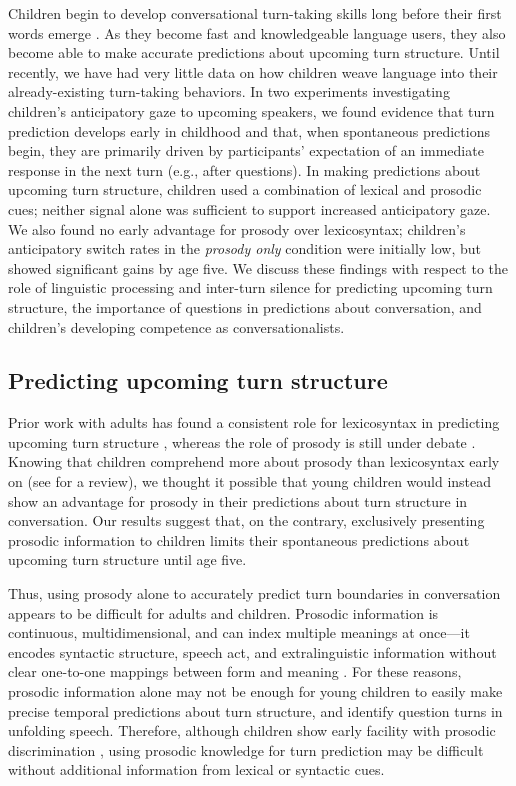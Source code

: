 \documentclass[authoryear, 12pt]{elsarticle}
\begin{document}
Children begin to develop conversational turn-taking skills long before their first words emerge \citep{bateson1975, hilbrink2015, jaffe2001, snow1977}. As they become fast and knowledgeable language users, they also become able to make accurate predictions about upcoming turn structure. Until recently, we have had very little data on how children weave language into their already-existing turn-taking behaviors. In two experiments investigating children's anticipatory gaze to upcoming speakers, we found evidence that turn prediction develops early in childhood and that, when spontaneous predictions begin, they are primarily driven by participants' expectation of an immediate response in the next turn (e.g., after questions). In making predictions about upcoming turn structure, children used a combination of lexical and prosodic cues; neither signal alone was sufficient to support increased anticipatory gaze. We also found no early advantage for prosody over lexicosyntax; children's anticipatory switch rates in the \textit{prosody only} condition were initially low, but showed significant gains by age five. We discuss these findings with respect to the role of linguistic processing and inter-turn silence for predicting upcoming turn structure, the importance of questions in predictions about conversation, and children's developing competence as conversationalists.

\subsection*{Predicting upcoming turn structure}

Prior work with adults has found a consistent role for lexicosyntax in predicting upcoming turn structure \citep{de-ruiter2006, magyari2012}, whereas the role of prosody is still under debate \citep{duncan1972, ford1996, bogelstorreira2015}. Knowing that children comprehend more about prosody than lexicosyntax early on (see \citealp{speer2009} for a review), we thought it possible that young children would instead show an advantage for prosody in their predictions about turn structure in conversation. Our results suggest that, on the contrary, exclusively presenting prosodic information to children limits their spontaneous predictions about upcoming turn structure until age five.

Thus, using prosody alone to accurately predict turn boundaries in conversation appears to be difficult for adults and children. Prosodic information is continuous, multidimensional, and can index multiple meanings at once---it encodes syntactic structure, speech act, and extralinguistic information without clear one-to-one mappings between form and meaning \citep{cutler1997, shriberg1998, lammertink2015}. For these reasons, prosodic information alone may not be enough for young children to easily make precise temporal predictions about turn structure, and identify question turns in unfolding speech. Therefore, although children show early facility with prosodic discrimination \citep{nazzi2003, soderstrom2003, johnson2001, jusczyk1995, morgan1995, mehler1988}, using prosodic knowledge for turn prediction may be difficult without additional information from lexical or syntactic cues.
\end{document}
